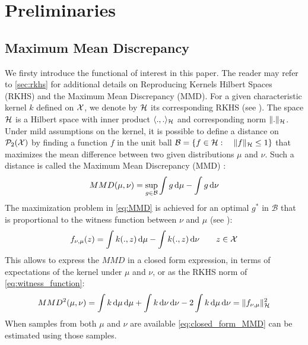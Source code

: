 
\section{Preliminaries}\label{sec:preliminaries}


\subsection{Maximum Mean Discrepancy}\label{subsec:MMD}
We firsty introduce the functional of interest in this paper. The reader may refer to \cref{sec:rkhs} for additional details on Reproducing Kernels Hilbert Spaces (RKHS) and the Maximum Mean Discrepancy (MMD). For a given characteristic kernel $k$ defined on ${{\mathcal X}}$, we denote by ${{\mathcal H}}$ its corresponding RKHS (see \cite{smola1998learning}). The space ${{\mathcal H}}$ is a Hilbert space with inner product $\langle .,. \rangle_{{{\mathcal H}}}$ and corresponding norm $\Vert . \Vert_{{{\mathcal H}}}$. %
Under mild assumptions on the kernel, it is possible to define a distance on $\mathcal{P}_2({{\mathcal X}})$ by finding a function $f$ in the unit ball $\mathcal{B} = \{ f\in {{\mathcal H}} : \quad \Vert f\Vert_{{{\mathcal H}}}\leq 1 \}$ that maximizes the mean difference between two given distributions $\mu$ and $\nu$. Such a distance is called the Maximum Mean Discrepancy  (MMD) \cite{Gretton:2012}:
\begin{align}\label{eq:MMD}
MMD(\mu,\nu) = \sup_{g\in \mathcal{B}} \int g\mathop{}\!\mathrm{d}\mu - \int g \mathop{}\!\mathrm{d}\nu
\end{align}
The maximization problem in \cref{eq:MMD} is achieved for an optimal $g^*$ in $\mathcal{B}$ that is proportional to the  witness function between $\nu$ and $\mu$ (see  \cite{gretton2012kernel}):
\begin{align}\label{eq:witness_function}
f_{\nu,\mu}(z) = \int k(.,z)\mathop{}\!\mathrm{d} \mu - \int k(.,z)\mathop{}\!\mathrm{d} \nu  \qquad z\in {{\mathcal X}}
\end{align}
This allows to express the $MMD$ in a closed form expression, in terms of expectations of the kernel under $\mu$ and $\nu$, or as the RKHS norm of \cref{eq:witness_function}:
\begin{align}\label{eq:closed_form_MMD}
MMD^2(\mu,\nu) = \int k\mathop{}\!\mathrm{d}\mu \mathop{}\!\mathrm{d}\mu + \int k\mathop{}\!\mathrm{d}\nu \mathop{}\!\mathrm{d} \nu - 2\int k\mathop{}\!\mathrm{d}\mu \mathop{}\!\mathrm{d} \nu=\Vert f_{\nu,\mu} \Vert^2_{\mathcal{H}} 
\end{align}
When samples from both $\mu$ and $\nu$ are available \cref{eq:closed_form_MMD} can be estimated using those samples. 

